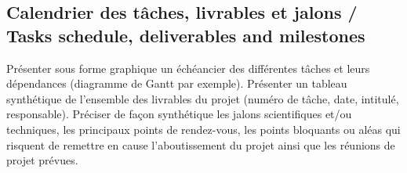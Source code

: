 \subsection{Calendrier des tâches, livrables et jalons / Tasks schedule, deliverables and milestones}
\begin{xcomment} 
Pr\'esenter sous forme graphique un \'ech\'eancier des diff\'erentes tâches et leurs d\'ependances (diagramme de Gantt par exemple).
Pr\'esenter un tableau synth\'etique de l'ensemble des livrables du projet (num\'ero de tâche, date, intitul\'e, responsable).
Pr\'eciser de façon synth\'etique les jalons scientifiques et/ou techniques, les principaux points de rendez-vous, les points bloquants ou al\'eas qui risquent de remettre en cause l'aboutissement du projet ainsi que les r\'eunions de projet pr\'evues.

\end{xcomment}

\endinput
